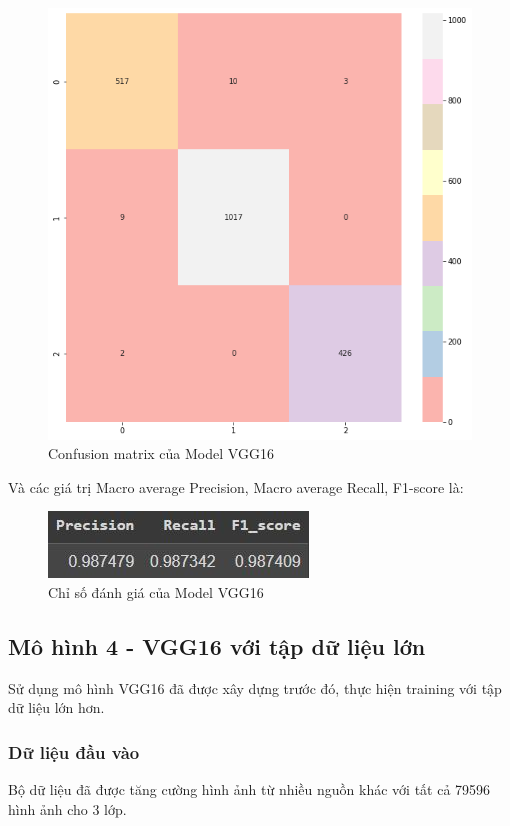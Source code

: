 \begin{center}
    \begin{figure}[!h]
        \centering
        \includegraphics[scale = 0.42]{fileanh/24.png}
        \caption{Confusion matrix của Model VGG16}
    \end{figure}
\end{center}
Và các giá trị Macro average Precision, Macro average Recall, F1-score là:
\begin{center}
    \begin{figure}[!h]
        \centering
        \includegraphics[scale = 1.5]{fileanh/25.jpg}
        \caption{Chỉ số đánh giá của Model VGG16}
    \end{figure}
\end{center}

\subsection{Mô hình 4 - VGG16 với tập dữ liệu lớn}
Sử dụng mô hình VGG16 đã được xây dựng trước đó, thực hiện training với tập dữ liệu lớn hơn.
\subsubsection{Dữ liệu đầu vào }
Bộ dữ liệu đã được tăng cường hình ảnh từ nhiều nguồn khác với tất cả 79596 hình ảnh cho 3 lớp.

